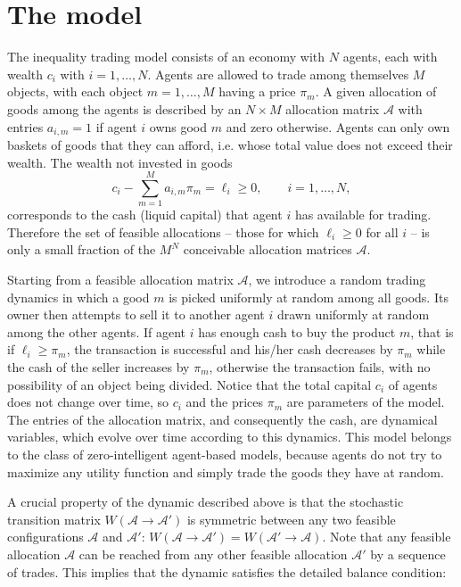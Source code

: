 \section{The model}
\label{sec:modelDescription}

The inequality trading model consists of an economy with $N$ agents, each with wealth $c_i$ with $ i = 1, \ldots, N$. Agents are allowed to trade among themselves $M$ objects, with each object $m = 1, \ldots,M$ having a price $\pi_m$. A given allocation of goods among the agents is described by an $N\times M$ allocation matrix $\mathcal{A}$ with entries $a_{i,m} = 1$ if agent $i$ owns good $m$ and zero otherwise. Agents can only own baskets of goods that they can afford, i.e. whose total value does not exceed their wealth. The wealth not invested in goods
\begin{equation}
c_i -  \sum_{m=1}^M a_{i , m} \pi_m =\ell_i\ge 0, \quad\quad i=1,\ldots,N,
\label{eq:1}
\end{equation}
corresponds to the cash (liquid capital) that agent $i$ has available for trading.  Therefore 
the set of feasible allocations -- those for which $\ell_i\ge 0$ for all $i$ -- is only a small fraction of the $M^N$ conceivable allocation matrices $\mathcal{A}$.

Starting from a feasible allocation matrix $\mathcal{A}$, we introduce a random trading dynamics in which a good $m$ is picked uniformly at random among all goods. Its owner then attempts to sell it to another agent $i$ drawn uniformly at random among the other agents. If agent $i$ has enough cash to buy the product $m$, that is if $\ell_i \ge \pi_m$, the transaction is successful and his/her cash decreases by $\pi_m$ while the cash of the seller increases by $\pi_m$, otherwise the transaction fails, with no possibility of an object being divided. Notice that the total capital $c_i$ of agents does not change over time, so $c_i$ and the prices $\pi_m$ are parameters of the model. The entries of the allocation matrix, and consequently the cash, are dynamical variables, which evolve over time according to this dynamics. This model belongs to the class of zero-intelligent agent-based models, because agents do not try to maximize any utility function and simply trade the goods they have at random.

A crucial property of the dynamic described above is that the stochastic transition matrix $W(\mathcal{A}\to\mathcal{A}')$ is symmetric between any two feasible configurations $\mathcal{A}$ and $\mathcal{A}'$: $W(\mathcal{A}\to \mathcal{A}')=W(\mathcal{A}'\to \mathcal{A})$. Note that any feasible allocation $\mathcal{A}$ can be reached from any other feasible allocation $\mathcal{A}'$ by a sequence of trades. This implies that the dynamic satisfies the detailed balance condition:

